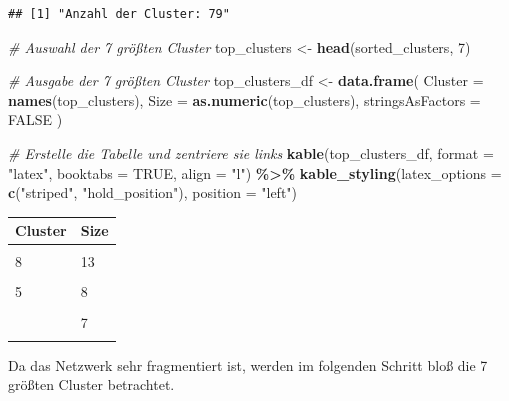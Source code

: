 \documentclass[
]{article}
\newenvironment{Shaded}{\begin{snugshade}}{\end{snugshade}}
\newcommand{\AttributeTok}[1]{\textcolor[rgb]{0.13,0.29,0.53}{#1}}
\newcommand{\CommentTok}[1]{\textcolor[rgb]{0.56,0.35,0.01}{\textit{#1}}}
\newcommand{\ConstantTok}[1]{\textcolor[rgb]{0.56,0.35,0.01}{#1}}
\newcommand{\DecValTok}[1]{\textcolor[rgb]{0.00,0.00,0.81}{#1}}
\newcommand{\FunctionTok}[1]{\textcolor[rgb]{0.13,0.29,0.53}{\textbf{#1}}}
\newcommand{\NormalTok}[1]{#1}
\newcommand{\OtherTok}[1]{\textcolor[rgb]{0.56,0.35,0.01}{#1}}
\newcommand{\SpecialCharTok}[1]{\textcolor[rgb]{0.81,0.36,0.00}{\textbf{#1}}}
\newcommand{\StringTok}[1]{\textcolor[rgb]{0.31,0.60,0.02}{#1}}
\begin{document}
\begin{verbatim}
## [1] "Anzahl der Cluster: 79"
\end{verbatim}

\begin{Shaded}
\begin{Highlighting}[]
\CommentTok{\# Auswahl der 7 größten Cluster}
\NormalTok{top\_clusters }\OtherTok{\textless{}{-}} \FunctionTok{head}\NormalTok{(sorted\_clusters, }\DecValTok{7}\NormalTok{)}

\CommentTok{\# Ausgabe der 7 größten Cluster}
\NormalTok{top\_clusters\_df }\OtherTok{\textless{}{-}} \FunctionTok{data.frame}\NormalTok{(}
\AttributeTok{Cluster =} \FunctionTok{names}\NormalTok{(top\_clusters),}
\AttributeTok{Size =} \FunctionTok{as.numeric}\NormalTok{(top\_clusters),}
\AttributeTok{stringsAsFactors =} \ConstantTok{FALSE}
\NormalTok{)}

\CommentTok{\# Erstelle die Tabelle und zentriere sie links}
\FunctionTok{kable}\NormalTok{(top\_clusters\_df, }\AttributeTok{format =} \StringTok{"latex"}\NormalTok{, }\AttributeTok{booktabs =} \ConstantTok{TRUE}\NormalTok{, }\AttributeTok{align =} \StringTok{"l"}\NormalTok{) }\SpecialCharTok{\%\textgreater{}\%}
  \FunctionTok{kable\_styling}\NormalTok{(}\AttributeTok{latex\_options =} \FunctionTok{c}\NormalTok{(}\StringTok{"striped"}\NormalTok{, }\StringTok{"hold\_position"}\NormalTok{),}
                \AttributeTok{position =} \StringTok{"left"}\NormalTok{)}
\end{Highlighting}
\end{Shaded}

\begin{tabular}{ll}
\toprule
Cluster & Size\\
\midrule
\cellcolor{gray!10}{1} & \cellcolor{gray!10}{44}\\
8 & 13\\
\cellcolor{gray!10}{35} & \cellcolor{gray!10}{9}\\
5 & 8\\
\cellcolor{gray!10}{15} & \cellcolor{gray!10}{8}\\
\addlinespace
19 & 7\\
\cellcolor{gray!10}{12} & \cellcolor{gray!10}{6}\\
\bottomrule
\end{tabular}

Da das Netzwerk sehr fragmentiert ist, werden im folgenden Schritt bloß
die 7 größten Cluster betrachtet.
\end{document}
